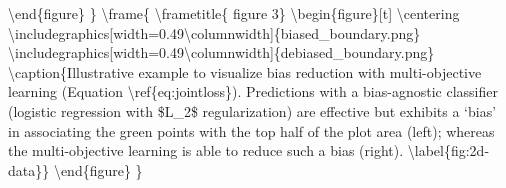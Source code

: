 \documentclass{beamer}%
\begin{document}
\textbackslash{}end\{figure\}%
\}%
\textbackslash{}frame\{%
\textbackslash{}frametitle\{%
figure 3\}%
\textbackslash{}begin\{figure\}{[}t{]}\newline%
\textbackslash{}centering\newline%
\textbackslash{}includegraphics{[}width=0.49\textbackslash{}columnwidth{]}\{biased\_boundary.png\}\newline%
\textbackslash{}includegraphics{[}width=0.49\textbackslash{}columnwidth{]}\{debiased\_boundary.png\}\newline%
\textbackslash{}caption\{Illustrative example to visualize bias reduction with multi{-}objective learning (Equation \textbackslash{}ref\{eq:jointloss\}). Predictions\newline%
with a bias{-}agnostic classifier (logistic regression with \$L\_2\$ regularization) are effective but exhibits a `bias' in associating the green points with the top half of the plot area (left); whereas the multi{-}objective learning is able to reduce such a bias (right).\newline%
\textbackslash{}label\{fig:2d{-}data\}\}\newline%
\textbackslash{}end\{figure\}%
\}%
\end{document}
